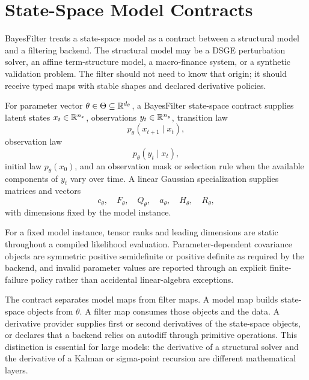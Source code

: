 \chapter{State-Space Model Contracts}
\label{ch:bf-state-space-contracts}

BayesFilter treats a state-space model as a contract between a structural model
and a filtering backend.  The structural model may be a DSGE perturbation
solver, an affine term-structure model, a macro-finance system, or a synthetic
validation problem.  The filter should not need to know that origin; it should
receive typed maps with stable shapes and declared derivative policies.

\begin{definition}
\label{def:bf-ssm-contract}
For parameter vector $\theta \in \Theta \subseteq \mathbb{R}^{d_\theta}$, a
BayesFilter state-space contract supplies latent states $x_t \in \mathbb{R}^{n_x}$,
observations $y_t \in \mathbb{R}^{n_y}$, transition law
\[
  p_\theta(x_{t+1}\mid x_t),
\]
observation law
\[
  p_\theta(y_t\mid x_t),
\]
initial law $p_\theta(x_0)$, and an observation mask or selection rule when the
available components of $y_t$ vary over time.  A linear Gaussian specialization
supplies matrices and vectors
\[
  c_\theta,\quad F_\theta,\quad Q_\theta,\quad
  a_\theta,\quad H_\theta,\quad R_\theta,
\]
with dimensions fixed by the model instance.
\end{definition}

\begin{assumption}
\label{asm:bf-shape-value-contract}
For a fixed model instance, tensor ranks and leading dimensions are static
throughout a compiled likelihood evaluation.  Parameter-dependent covariance
objects are symmetric positive semidefinite or positive definite as required by
the backend, and invalid parameter values are reported through an explicit
finite-failure policy rather than accidental linear-algebra exceptions.
\end{assumption}

The contract separates model maps from filter maps.  A model map builds
state-space objects from $\theta$.  A filter map consumes those objects and the
data.  A derivative provider supplies first or second derivatives of the
state-space objects, or declares that a backend relies on autodiff through
primitive operations.  This distinction is essential for large models: the
derivative of a structural solver and the derivative of a Kalman or sigma-point
recursion are different mathematical layers.


